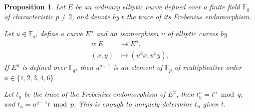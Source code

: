 \documentclass[12pt]{article}
\theoremstyle{plain}
\newtheorem{proposition}[theorem]{Proposition}
\theoremstyle{definition}
\def\F{\ensuremath{\mathbb{F}}}
\begin{document}
\begin{proposition}
  \label{proposition:twisttrace}
  Let $E$ be an ordinary elliptic curve defined over a finite field
  $\F_q$ of characteristic $p\ne2$, and denote by $t$ the trace of its
  Frobenius endomorphism.

  Let $u\in\bar{\F}_q$, define a curve $E^u$ and an isomorphism
  $\upsilon$ of elliptic curves by
  \begin{equation*}
    \begin{aligned}
      \upsilon : E &\to E^u,\\
      (x,y) &\mapsto (u^2x,u^3y).
    \end{aligned}
  \end{equation*}
  If $E^u$ is defined over $\F_q$, then $u^{q-1}$ is an element of
  $\F_p$ of multiplicative order $n\in\{1,2,3,4,6\}$.

  Let $t_u$ be the trace of the Frobenius endomorphism of $E^u$, then
  $t_u^n=t^n \bmod q$, and $t_u=u^{q-1}t\bmod p$. This is enough to
  uniquely determine $t_u$ given $t$.
\end{proposition}
\end{document}
